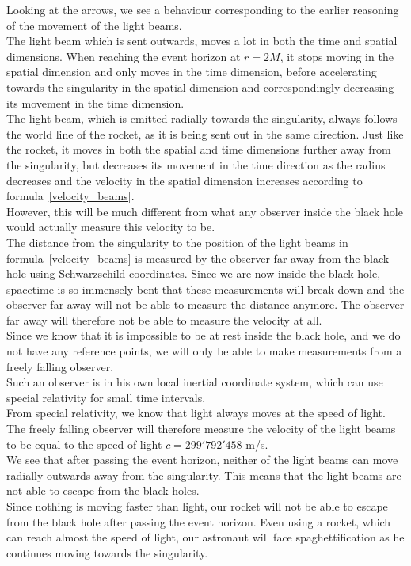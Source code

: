 \documentclass[reprint,english,notitlepage]{revtex4-2}
\begin{document}
        Looking at the arrows, we see a behaviour corresponding to the earlier reasoning of the movement of the light beams.\\
        The light beam which is sent outwards, moves a lot in both the time and spatial dimensions.
        When reaching the event horizon at $r = 2M$, it stops moving in the spatial dimension and only moves in the time dimension, before accelerating towards the singularity in the spatial dimension and correspondingly decreasing its movement in the time dimension.\\
        The light beam, which is emitted radially towards the singularity, always follows the world line of the rocket, as it is being sent out in the same direction.
        Just like the rocket, it moves in both the spatial and time dimensions further away from the singularity, but decreases its movement in the time direction as the radius decreases and the velocity in the spatial dimension increases according to formula~\eqref{velocity_beams}.\\

        However, this will be much different from what any observer inside the black hole would actually measure this velocity to be.\\
        The distance from the singularity to the position of the light beams in formula~\eqref{velocity_beams} is measured by the observer far away from the black hole using Schwarzschild coordinates.
        Since we are now inside the black hole, spacetime is so immensely bent that these measurements will break down and the observer far away will not be able to measure the distance anymore.
        The observer far away will therefore not be able to measure the velocity at all.\\

        Since we know that it is impossible to be at rest inside the black hole, and we do not have any reference points, we will only be able to make measurements from a freely falling observer.\\
        Such an observer is in his own local inertial coordinate system, which can use special relativity for small time intervals.\\
        From special relativity, we know that light always moves at the speed of light.
        The freely falling observer will therefore measure the velocity of the light beams to be equal to the speed of light $c = 299'792'458$ m/s.\\

        We see that after passing the event horizon, neither of the light beams can move radially outwards away from the singularity.
        This means that the light beams are not able to escape from the black holes.\\
        Since nothing is moving faster than light, our rocket will not be able to escape from the black hole after passing the event horizon.
        Even using a rocket, which can reach almost the speed of light, our astronaut will face spaghettification as he continues moving towards the singularity.
\end{document}
